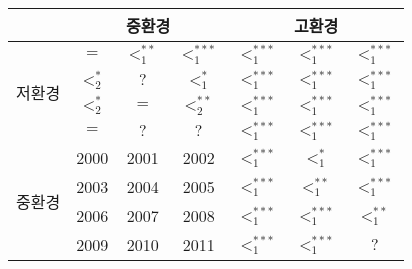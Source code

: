 \begin{tabular}{c|c|c|c|c|c|c}
\hline & \multicolumn{3}{|c|}{중환경} & \multicolumn{3}{c}{고환경} \\
\hline \multirow{4}{*}{저환경} & $=$ & $<_{1}^{**}$ & $<_{1}^{***}$ & $<_{1}^{***}$ & $<_{1}^{***}$ & $<_{1}^{***}$ \\
\cline{2-7} & $<_{2}^{*}$ & $?$ & $<_{1}^{*}$ & $<_{1}^{***}$ & $<_{1}^{***}$ & $<_{1}^{***}$ \\
\cline{2-7} & $<_{2}^{*}$ & $=$ & $<_{2}^{**}$ & $<_{1 }^{***}$ & $<_{1 }^{***}$ & $<_{1 }^{***}$ \\
\cline{2-7} & $=$ & $?$ & $?$ & $<_{1}^{***}$ & $<_{1}^{***}$ & $<_{1}^{***}$ \\
\hline \multirow{4}{*}{중환경} & 2000 & 2001 & 2002 & $<_{1}^{***}$ & $<_{1}^{*}$ & $<_{1}^{***}$ \\
\cline{2-7} & 2003 & 2004 & 2005 & $<_{1}^{***}$ & $<_{1}^{**}$ & $<_{1}^{***}$ \\
\cline{2-7} & 2006 & 2007 & 2008 & $<_{1}^{***}$ & $<_{1}^{***}$ & $<_{1}^{**}$ \\
\cline{2-7} & 2009 & 2010 & 2011 & $<_{1}^{***}$ & $<_{1}^{***}$ & $?$ \\
\hline
\end{tabular}